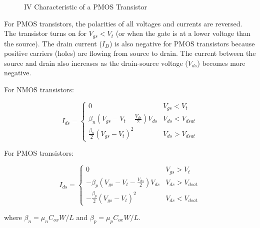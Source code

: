 \documentclass[fleqn]{article}
\begin{document}
\begin{enumerate}
		\begin{figure}[H]				
			\centerline{}
			\caption{IV Characteristic of a PMOS Transistor}
			\label{fig::iv_characteristics_pmos}
		\end{figure}
		
		For PMOS transistors, the polarities of all voltages and currents are reversed. The transistor turns on for $V_{gs} < V_t$  (or when the gate is at a lower voltage than the source). The drain current ($I_D$) is also negative for PMOS transistors because positive carriers (holes) are flowing from source to drain. The current between the source and drain also increases as the drain-source voltage ($V_{ds}$) becomes more negative.
		
		For NMOS transistors:
		
		\begin{equation*}
			I_{ds} = \begin{cases}
				0 & V_{gs} < V_t \\
				\beta_n\left(V_{gs}-V_t-\frac{V_{ds}}{2}\right)V_{ds} & V_{ds} < V_{dsat} \\
				\frac{\beta_n}{2}(V_{gs}-V_t)^2 & V_{ds} > V_{dsat}
			\end{cases}
		\end{equation*}
		
		For PMOS transistors:
		
		\begin{equation*}
			I_{ds} = \begin{cases}
				0 & V_{gs} > V_t \\
				-\beta_p\left(V_{gs}-V_t-\frac{V_{ds}}{2}\right)V_{ds} & V_{ds} > V_{dsat} \\
				-\frac{\beta_p}{2}(V_{gs}-V_t)^2 & V_{ds} < V_{dsat}
			\end{cases}
		\end{equation*}
		
		where $\beta_n = \mu_nC_{ox}W/L$ and $\beta_p = \mu_pC_{ox}W/L$.
		

\end{enumerate}
\end{document}
